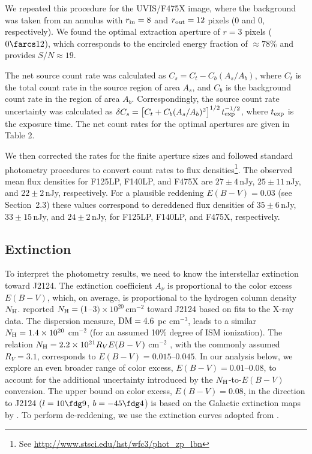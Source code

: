 \documentclass[iop]{emulateapj}
\begin{document}
We repeated this procedure for the UVIS/F475X image, where the background was taken from an annulus with $r_{\rm in}=8 $ and $r_{\rm out}=12$ pixels  (0 and 0, respectively).  We found  the optimal extraction aperture of  $r=3$ pixels  ($0\farcs12$), which corresponds to the  encircled energy fraction of $\approx78\%$ and provides $S/N\approx19$.  

The net source count rate was calculated as $C_{s}=C_{t} - C_{b} (A_{s}/A_{b})$, where $C_{t}$ is the total count rate in the source region of area $A_{s}$, and $C_{b}$ is the background count rate in the region of area $A_{b}$. Correspondingly, the source count rate uncertainty was calculated as  $\delta C_{s}=\left[ C_{t} + C_{b} (A_{s}/A_{b})^2 \right]^{1/2}t_{\rm exp}^{-1/2}$, where $t_{\rm exp}$ is the exposure time. The net count rates for the optimal apertures are given in Table 2. 

We then corrected the rates for the finite aperture sizes and followed standard photometry procedures to convert count rates to flux densities\footnote{See \url{http://www.stsci.edu/hst/wfc3/phot_zp_lbn}}. The observed mean flux densities for F125LP, F140LP, and F475X are $27\pm4$\,nJy, $25\pm11$\,nJy, and $22\pm2$\,nJy, respectively.  For a plausible reddening $E(B-V)=0.03$ (see Section~2.3) these values correspond to dereddened  flux densities of $35\pm6$\,nJy, $33\pm15$\,nJy, and $24\pm2$\,nJy, for F125LP, F140LP, and F475X, respectively.


\subsection{Extinction}

To interpret the photometry results, we need to know the interstellar extinction toward J2124. The extinction coefficient $A_\nu$ is proportional to the color excess $E(B-V)$, which, on average, is proportional to the hydrogen column density $N_{\rm H}$. \cite{2006ApJ...638..951Z} reported $N_{\rm H}=(1$--$3)\times10^{20}$\,cm$^{-2}$ toward J2124 based on fits to the X-ray data. The dispersion measure, ${\rm DM}=4.6$ pc cm$^{-3}$,   leads to a similar $N_{\rm H}=1.4\times10^{20}$ cm$^{-2}$ (for an assumed 10\% degree of ISM ionization). The relation $N_{\rm H} = 2.2\times10^{21} R_V E(B-V)$ cm$^{-2}$   \citep{1975ApJ...198...95G,2009MNRAS.400.2050G}, with the commonly assumed $R_V=3.1$,  corresponds to  $E(B-V)=0.015$--$0.045$. In our analysis below, we explore an even broader range of color excess, $E(B-V)=0.01$--0.08, to account for the additional uncertainty introduced by the $N_{\rm H}$-to-$E(B-V)$ conversion. The upper bound on color excess, $E(B-V) = 0.08$, in the direction to J2124 ($l=10\fdg9$, $b=-45\fdg4$) is based on the Galactic extinction maps by \citet{1998ApJ...500..525S}. To perform  de-reddening, we use the extinction curves adopted from \citet{2003ApJ...588..871C}.
\end{document}
